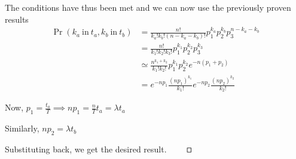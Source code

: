 \documentclass{beamer}
\providecommand{\pr}[1]{\ensuremath{\Pr\left(#1\right)}}
\begin{document}
	\begin{frame}
	The conditions have thus been met and we can now use the previously proven results
	\begin{align}
		\pr{k_a~\mathrm{in}~t_a, k_b~\mathrm{in}~t_b} &= \frac{n!}{k_a! k_b! (n-k_a-k_b)!} p_1^{k_a} p_2^{k_b} p_3^{n - k_a - k_b} \\
		&= \frac{n!}{k_1! k_2! k_3!} p_1^{k_1} p_2^{k_2} p_3^{k_3} \\
		&\simeq \frac{n^{k_1 + k_2}}{k_1! k_2!} p_1^{k_1} p_2^{k_2} e^{-n(p_1 + p_2)} \\
		&= e^{-np_1} \frac{(np_1)^{k_1}}{k_1!} e^{-np_2} \frac{(np_2)^{k_2}}{k_2!}
	\end{align}
	
	Now, $p_1 = \frac{t_a}{T} \implies np_1 = \frac{n}{T} t_a = \lambda t_a$
	
	Similarly, $np_2 = \lambda t_b$
	
	Substituting back, we get the desired result. $\qed$
	\end{frame}
	
\end{document}
